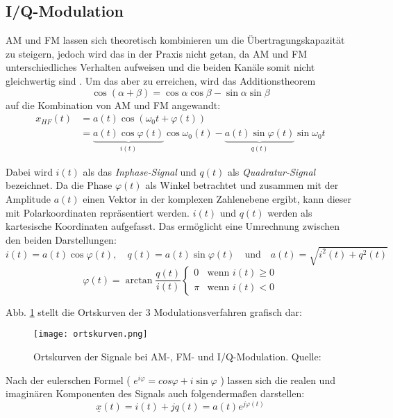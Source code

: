 \subsection{I/Q-Modulation}
\label{iq}
\ac{AM} und \ac{FM} lassen sich theoretisch kombinieren um die Übertragungskapazität zu steigern, jedoch wird das in der Praxis nicht getan, da AM und FM unterschiedliches Verhalten aufweisen und die beiden Kanäle somit nicht gleichwertig sind \cite[vgl. Heuberger, e. a., S. 40]{Heuberger:2017}. Um das aber zu erreichen, wird das Additionstheorem 
\[ \cos (\alpha + \beta) = \cos \alpha \cos \beta - \sin \alpha \sin \beta\] 
auf die Kombination von AM und FM angewandt:
\begin{align*}
	x_{HF}(t) &= a(t) \cos (\omega_0 t + \varphi(t)) \\
			  &= \underbrace{a(t) \cos \varphi(t)}_{i(t)} \cos \omega_0(t) - \underbrace{a(t) \sin \varphi(t)}_{q(t)} \sin \omega_0t
\end{align*}

Dabei wird \(i(t) \)  als das \textit{Inphase-Signal} und \(q(t)\) als \textit{Quadratur-Signal} bezeichnet.
Da die Phase $\varphi(t)$ als Winkel betrachtet und zusammen mit der Amplitude $a(t)$ einen Vektor in der komplexen Zahlenebene ergibt, kann dieser mit Polarkoordinaten repräsentiert werden.
$i(t)$ und $q(t)$ werden als kartesische Koordinaten aufgefasst.
Das ermöglicht eine Umrechnung zwischen den beiden Darstellungen:
\[ i(t) = a(t) \cos \varphi(t),  \quad q(t) = a(t)\sin \varphi(t) \quad \text{und} \quad  a(t) = \sqrt{i^2 (t) + q^2(t)}\]
\[  \varphi (t) = \arctan \frac{q(t)}{i(t)}  
					\begin{cases} 
						0	 & \text{wenn } i(t) \geq 0 \\
						\pi  & \text{wenn } i(t) < 0
					\end{cases}
\]

Abb. \ref{ortskurven} stellt die Ortskurven der 3 Modulationsverfahren grafisch dar:
\begin{figure}[ht]
	\centering
	\texttt{[image: ortskurven.png]}
	\caption[Ortskurven der Signale bei AM-, FM- und I/Q-Modulation]{Ortskurven der Signale bei AM-, FM- und I/Q-Modulation. Quelle: \cite[Heuberger, e. a., S. 141]{Heuberger:2017}} 
	\label{ortskurven}
\end{figure}


\newpage

Nach der eulerschen Formel ( \( e^{i\varphi} = cos \varphi + i \sin \varphi \) ) lassen sich die realen und imaginären Komponenten des Signals auch folgendermaßen darstellen:
\[ \underline{x} (t) = i(t) + jq(t) = a(t) e^{j \varphi(t)}\]

